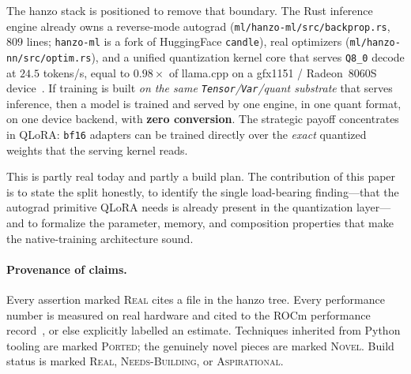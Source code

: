 \documentclass[11pt]{article}
\begin{document}
The hanzo stack is positioned to remove that boundary. The Rust inference engine already owns a reverse-mode autograd (\texttt{ml/hanzo-ml/src/backprop.rs}, $809$ lines; \texttt{hanzo-ml} is a fork of HuggingFace \texttt{candle}), real optimizers (\texttt{ml/hanzo-nn/src/optim.rs}), and a unified quantization kernel core that serves \texttt{Q8\_0} decode at $24.5$ tokens/s, equal to $0.98\times$ of llama.cpp on a gfx1151 / Radeon~8060S device~\cite{hanzo-rocm}. If training is built \emph{on the same \texttt{Tensor}/\texttt{Var}/quant substrate} that serves inference, then a model is trained and served by one engine, in one quant format, on one device backend, with \textbf{zero conversion}. The strategic payoff concentrates in QLoRA: \texttt{bf16} adapters can be trained directly over the \emph{exact} quantized weights that the serving kernel reads.

This is partly real today and partly a build plan. The contribution of this paper is to state the split honestly, to identify the single load-bearing finding---that the autograd primitive QLoRA needs is already present in the quantization layer---and to formalize the parameter, memory, and composition properties that make the native-training architecture sound.

\paragraph{Provenance of claims.} Every assertion marked \textsc{Real} cites a file in the hanzo tree. Every performance number is measured on real hardware and cited to the ROCm performance record~\cite{hanzo-rocm}, or else explicitly labelled an estimate. Techniques inherited from Python tooling are marked \textsc{Ported}; the genuinely novel pieces are marked \textsc{Novel}. Build status is marked \textsc{Real}, \textsc{Needs-Building}, or \textsc{Aspirational}.
\end{document}
